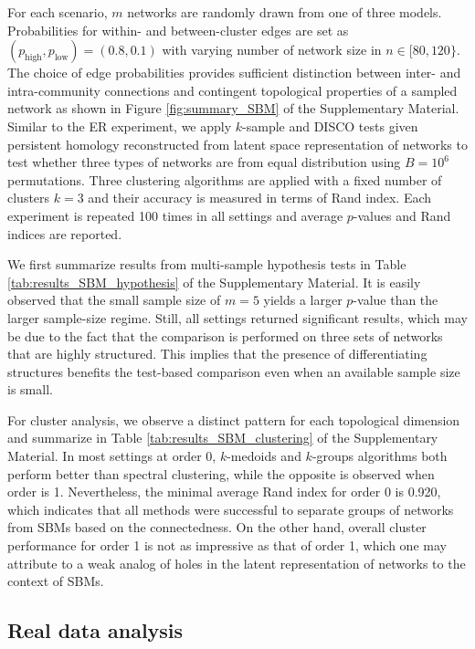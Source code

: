 \documentclass[12pt]{article}
\begin{document}
For each scenario, $m$ networks are randomly drawn from one of three models. Probabilities for within- and between-cluster edges are set as $(p_{\textrm{high}}, p_{\textrm{low}}) = (0.8, 0.1)$ with varying number of network size in $n \in \lbrack 80, 120 \rbrace$. The choice of edge probabilities provides sufficient distinction between inter- and intra-community connections and contingent topological properties of a sampled network as shown in Figure \ref{fig:summary_SBM} of the Supplementary Material. Similar to the ER experiment, we apply $k$-sample and DISCO tests given persistent homology reconstructed from latent space representation of networks to test whether three types of networks are from equal distribution using $B=10^6$ permutations. Three clustering algorithms are applied with a fixed number of clusters $k=3$ and their accuracy is measured in terms of Rand index. Each experiment is repeated 100 times in all settings and average $p$-values and Rand indices are reported. 


We first summarize results from multi-sample hypothesis tests in Table \ref{tab:results_SBM_hypothesis} of the Supplementary Material. It is easily observed that the small sample size of $m=5$ yields a larger $p$-value than the larger sample-size regime. Still, all settings returned significant results, which may be due to the fact that the comparison is performed on three sets of networks that are highly structured. This implies that the presence of differentiating structures benefits the test-based comparison even when an available sample size is small. 

For cluster analysis, we observe a distinct pattern for each topological dimension and summarize in Table \ref{tab:results_SBM_clustering} of the Supplementary Material. In most settings at order 0, $k$-medoids and $k$-groups algorithms both perform better than spectral clustering, while the opposite is observed when order is 1. Nevertheless, the minimal average Rand index for order 0 is 0.920, which indicates that all methods were successful to separate groups of networks from SBMs based on the connectedness. On the other hand, overall cluster performance for order 1 is not as impressive as that of order 1, which one may attribute to a weak analog of holes in the latent representation of networks to the context of SBMs.



\subsection{Real data analysis}
\end{document}
